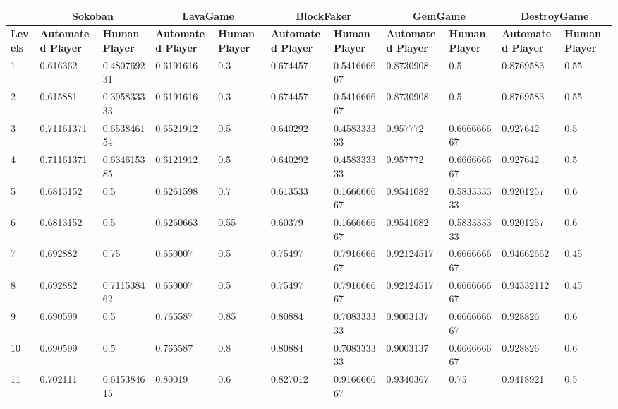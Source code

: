 \begin{landscape}
\begin{table}[!ht]
	\centering
	\begin{tabular}{|p{0.5in}|p{0.75in}|p{0.75in}|p{0.75in}|p{0.75in}|p{0.75in}|p{0.75in}|p{0.75in}|p{0.75in}|p{0.75in}|p{0.75in}|}
		\hline
		& \multicolumn{2}{c}{\textbf{Sokoban}} & \multicolumn{2}{c}{\textbf{LavaGame}} & \multicolumn{2}{c}{\textbf{\textbf{BlockFaker}}} & \multicolumn{2}{c}{\textbf{GemGame}} & \multicolumn{2}{c}{\textbf{DestroyGame}}\\
		\hline
		\textbf{Levels} & \textbf{Automated Player} & \textbf{Human Player} & \textbf{Automated Player} & \textbf{Human Player} & \textbf{Automated Player} & \textbf{Human Player} & \textbf{Automated Player} & \textbf{Human Player} & \textbf{Automated Player} & \textbf{Human Player}\\
		\hline
		1 & 0.616362 & 0.480769231 & 0.6191616 & 0.3 & 0.674457 & 0.541666667 & 0.8730908 & 0.5 & 0.8769583 & 0.55\\
		\hline
		2 & 0.615881 & 0.395833333 & 0.6191616 & 0.3 & 0.674457 & 0.541666667 & 0.8730908 & 0.5 & 0.8769583 & 0.55\\
		\hline
		3 & 0.71161371 & 0.653846154 & 0.6521912 & 0.5 & 0.640292 & 0.458333333 & 0.957772 & 0.666666667 & 0.927642 & 0.5\\
		\hline
		4 & 0.71161371 & 0.634615385 & 0.6121912 & 0.5 & 0.640292 & 0.458333333 & 0.957772 & 0.666666667 & 0.927642 & 0.5\\
		\hline
		5 & 0.6813152 & 0.5 & 0.6261598 & 0.7 & 0.613533 & 0.166666667 & 0.9541082 & 0.583333333 & 0.9201257 & 0.6\\
		\hline
		6 & 0.6813152 & 0.5 & 0.6260663 & 0.55 & 0.60379 & 0.166666667 & 0.9541082 & 0.583333333 & 0.9201257 & 0.6\\
		\hline
		7 & 0.692882 & 0.75 & 0.650007 & 0.5 & 0.75497 & 0.791666667 & 0.92124517 & 0.666666667 & 0.94662662 & 0.45\\
		\hline
		8 & 0.692882 & 0.711538462 & 0.650007 & 0.5 & 0.75497 & 0.791666667 & 0.92124517 & 0.666666667 & 0.94332112 & 0.45\\
		\hline
		9 & 0.690599 & 0.5 & 0.765587 & 0.85 & 0.80884 & 0.708333333 & 0.9003137 & 0.666666667 & 0.928826 & 0.6\\
		\hline
		10 & 0.690599 & 0.5 & 0.765587 & 0.8 & 0.80884 & 0.708333333 & 0.9003137 & 0.666666667 & 0.928826 & 0.6\\
		\hline
		11 & 0.702111 & 0.615384615 & 0.80019 & 0.6 & 0.827012 & 0.916666667 & 0.9340367 & 0.75 & 0.9418921 & 0.5\\

\end{tabular}
\end{table}
\end{landscape}
